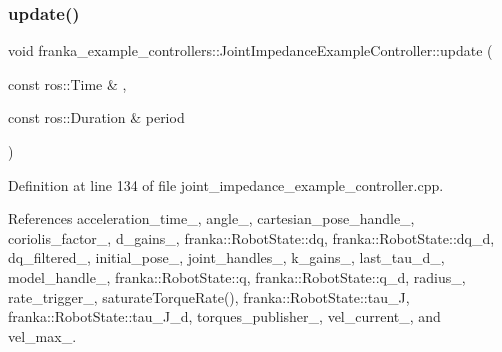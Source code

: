 \subsubsection{\texorpdfstring{update()}{update()}}
{\footnotesize\ttfamily void franka\+\_\+example\+\_\+controllers\+::\+Joint\+Impedance\+Example\+Controller\+::update (\begin{DoxyParamCaption}\item[{const ros\+::\+Time \&}]{,  }\item[{const ros\+::\+Duration \&}]{period }\end{DoxyParamCaption})\hspace{0.3cm}{\ttfamily [override]}}



Definition at line 134 of file joint\+\_\+impedance\+\_\+example\+\_\+controller.\+cpp.



References acceleration\+\_\+time\+\_\+, angle\+\_\+, cartesian\+\_\+pose\+\_\+handle\+\_\+, coriolis\+\_\+factor\+\_\+, d\+\_\+gains\+\_\+, franka\+::\+Robot\+State\+::dq, franka\+::\+Robot\+State\+::dq\+\_\+d, dq\+\_\+filtered\+\_\+, initial\+\_\+pose\+\_\+, joint\+\_\+handles\+\_\+, k\+\_\+gains\+\_\+, last\+\_\+tau\+\_\+d\+\_\+, model\+\_\+handle\+\_\+, franka\+::\+Robot\+State\+::q, franka\+::\+Robot\+State\+::q\+\_\+d, radius\+\_\+, rate\+\_\+trigger\+\_\+, saturate\+Torque\+Rate(), franka\+::\+Robot\+State\+::tau\+\_\+J, franka\+::\+Robot\+State\+::tau\+\_\+\+J\+\_\+d, torques\+\_\+publisher\+\_\+, vel\+\_\+current\+\_\+, and vel\+\_\+max\+\_\+.


